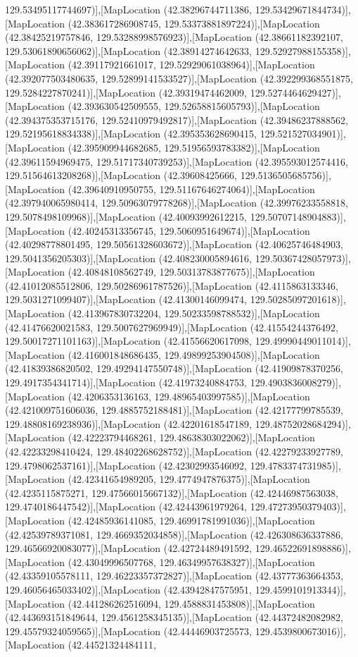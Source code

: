 129.53495117744697)],[MapLocation (42.38296744711386, 129.53429671844734)],[MapLocation (42.383617286908745, 129.53373881897224)],[MapLocation (42.38425219757846, 129.53288998576923)],[MapLocation (42.38661182392107, 129.53061890656062)],[MapLocation (42.38914274642633, 129.52927988155358)],[MapLocation (42.39117921661017, 129.52929061038964)],[MapLocation (42.392077503480635, 129.52899141533527)],[MapLocation (42.392299368551875, 129.5284227870241)],[MapLocation (42.39319474462009, 129.5274464629427)],[MapLocation (42.393630542509555, 129.52658815605793)],[MapLocation (42.394375353715176, 129.52410979492817)],[MapLocation (42.39486237888562, 129.52195618834338)],[MapLocation (42.395353628690415, 129.521527034901)],[MapLocation (42.395909944682685, 129.51956593783382)],[MapLocation (42.39611594969475, 129.51717340739253)],[MapLocation (42.395593012574416, 129.51564613208268)],[MapLocation (42.39608425666, 129.5136505685756)],[MapLocation (42.39640910950755, 129.51167646274064)],[MapLocation (42.397940065980414, 129.50963079778268)],[MapLocation (42.39976233558818, 129.5078498109968)],[MapLocation (42.40093992612215, 129.50707148904883)],[MapLocation (42.40245313356745, 129.5060951649674)],[MapLocation (42.40298778801495, 129.50561328603672)],[MapLocation (42.40625746484903, 129.5041356205303)],[MapLocation (42.408230005894616, 129.50367428057973)],[MapLocation (42.40848108562749, 129.50313783877675)],[MapLocation (42.41012085512806, 129.50286961787526)],[MapLocation (42.4115863133346, 129.5031271099407)],[MapLocation (42.41300146099474, 129.50285097201618)],[MapLocation (42.413967830732204, 129.50233598788532)],[MapLocation (42.41476620021583, 129.5007627969949)],[MapLocation (42.41554244376492, 129.50017271101163)],[MapLocation (42.41556620617098, 129.49990449011014)],[MapLocation (42.416001848686435, 129.49899253904508)],[MapLocation (42.41839386820502, 129.49294147550748)],[MapLocation (42.41909878370256, 129.4917354341714)],[MapLocation (42.41973240884753, 129.4903836008279)],[MapLocation (42.4206353136163, 129.48965403997585)],[MapLocation (42.421009751606036, 129.4885752188481)],[MapLocation (42.42177799785539, 129.48808169238936)],[MapLocation (42.42201618547189, 129.48752028684294)],[MapLocation (42.42223794468261, 129.48638303022062)],[MapLocation (42.42233298410424, 129.48402268628752)],[MapLocation (42.42279233927789, 129.4798062537161)],[MapLocation (42.42302993546092, 129.4783374731985)],[MapLocation (42.42341654989205, 129.4774947876375)],[MapLocation (42.4235115875271, 129.47566015667132)],[MapLocation (42.42446987563038, 129.4740186447542)],[MapLocation (42.42443961979264, 129.47273950379403)],[MapLocation (42.42485936141085, 129.46991781991036)],[MapLocation (42.42539789371081, 129.4669352034858)],[MapLocation (42.426308636337886, 129.46566920083077)],[MapLocation (42.42724489491592, 129.46522691898886)],[MapLocation (42.43049996507768, 129.46349957638327)],[MapLocation (42.43359105578111, 129.46223357372827)],[MapLocation (42.43777363664353, 129.46056465033402)],[MapLocation (42.43942847575951, 129.4599101913344)],[MapLocation (42.441286262516094, 129.4588831453808)],[MapLocation (42.443693151849644, 129.4561258345135)],[MapLocation (42.44372482082982, 129.45579324059565)],[MapLocation (42.44446903725573, 129.4539800673016)],[MapLocation (42.44521324484111, 